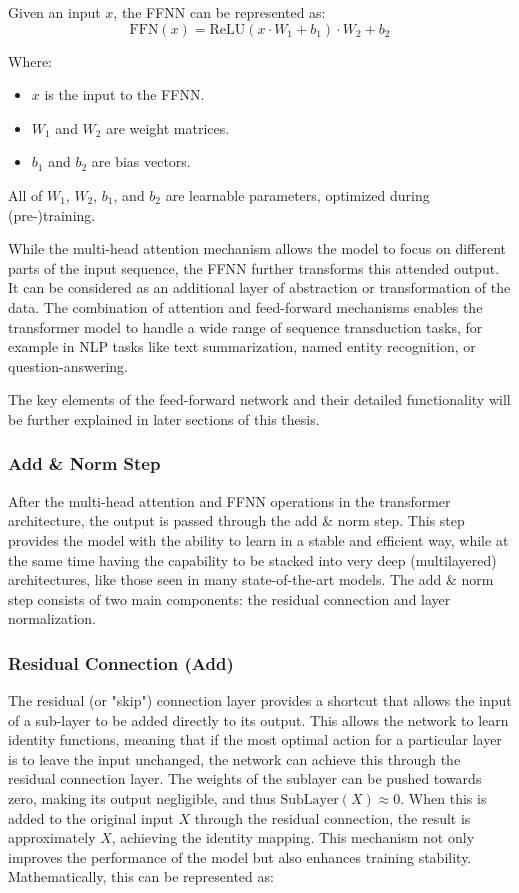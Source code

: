 Given an input \( x \), the FFNN can be represented as:
\begin{equation}
    \text{FFN}(x) = \text{ReLU}(x \cdot W_1 + b_1) \cdot W_2 + b_2
\end{equation}

Where:
\begin{itemize}
    \item \( x \) is the input to the FFNN.
    \item \( W_1 \) and \( W_2 \) are weight matrices.
    \item \( b_1 \) and \( b_2 \) are bias vectors.
\end{itemize}

All of \( W_1 \), \( W_2 \), \( b_1 \), and \( b_2 \) are learnable parameters, optimized during (pre-)training.

While the multi-head attention mechanism allows the model to focus on different parts of the input sequence, the FFNN further transforms this attended output. It can be considered as an additional layer of abstraction or transformation of the data. The combination of attention and feed-forward mechanisms enables the transformer model to handle a wide range of sequence transduction tasks, for example in NLP tasks like text summarization, named entity recognition, or question-answering.

The key elements of the feed-forward network and their detailed functionality will be further explained in later sections of this thesis.

\subsubsection{Add \& Norm Step}

After the multi-head attention and FFNN operations in the transformer architecture, the output is passed through the add \& norm step. This step provides the model with the ability to learn in a stable and efficient way, while at the same time having the capability to be stacked into very deep (multilayered) architectures, like those seen in many state-of-the-art models. The add \& norm step consists of two main components: the residual connection and layer normalization.

\subsubsection{Residual Connection (Add)}

The residual (or "skip") connection layer provides a shortcut that allows the input of a sub-layer to be added directly to its output. This allows the network to learn identity functions, meaning that if the most optimal action for a particular layer is to leave the input unchanged, the network can achieve this through the residual connection layer. The weights of the sublayer can be pushed towards zero, making its output negligible, and thus \(\text{SubLayer}(X) \approx 0\). When this is added to the original input \(X\) through the residual connection, the result is approximately \(X\), achieving the identity mapping. This mechanism not only improves the performance of the model but also enhances training stability. Mathematically, this can be represented as:

